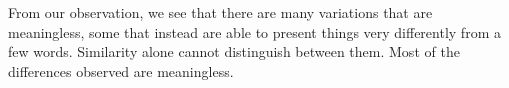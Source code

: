 From our observation, we see that
there are many variations that are meaningless, some that instead are able to present things very differently from a few words. Similarity alone cannot distinguish between them.
Most of the differences observed are meaningless.










